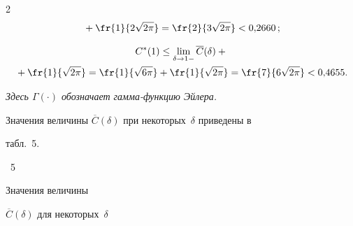 \begin{multicols}{2}
\begin{multline*}
{}+


\fr{1}{2\sqrt{2\pi}}


=\fr{2}{3\sqrt{2\pi}}<0{,}2660\,;


\end{multline*}





\vspace*{-12pt}





\noindent


\begin{multline*}


C^*(1) \le \lim_{\delta\to 1-}\overline{C}(\delta)+{}\\


{}+


\fr{1}{\sqrt{2\pi}}=


\fr{1}{\sqrt{6\pi}}+\fr{1}{\sqrt{2\pi}} =


\fr{7}{6\sqrt{2\pi}}<0{,}4655.


\end{multline*}


\textit{Здесь $\Gamma(\cdot)$ обозначает гамма-функцию Эйлера.}





\smallskip





Значения величины $\overline{C}(\delta)$ при некоторых~$\delta$ приведены в


табл.~5.





\vspace*{12pt}


\noindent %


\begin{center}


\parbox{38mm}{{\tablename~5}\ \ \small{Значения величины


$\overline{C}(\delta)$ для некоторых~$\delta$}}


\end{center}


\vspace*{2pt}





{\small


\begin{center}



\end{center}}
\end{multicols}
